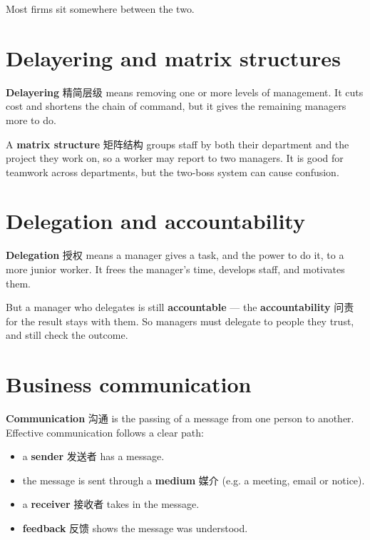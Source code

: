 \documentclass[11pt]{article}
\begin{document}
Most firms sit somewhere between the two.

\section*{Delayering and matrix structures}

\textbf{Delayering} 精简层级 means removing one or more levels of management. It cuts cost and shortens the chain of command, but it gives the remaining managers more to do.

A \textbf{matrix structure} 矩阵结构 groups staff by both their department and the project they work on, so a worker may report to two managers. It is good for teamwork across departments, but the two-boss system can cause confusion.

\section*{Delegation and accountability}

\textbf{Delegation} 授权 means a manager gives a task, and the power to do it, to a more junior worker. It frees the manager's time, develops staff, and motivates them.

But a manager who delegates is still \textbf{accountable} — the \textbf{accountability} 问责 for the result stays with them. So managers must delegate to people they trust, and still check the outcome.

\section*{Business communication}

\textbf{Communication} 沟通 is the passing of a message from one person to another. Effective communication follows a clear path:

\begin{itemize}
\item a \textbf{sender} 发送者 has a message.

\item the message is sent through a \textbf{medium} 媒介 (e.g. a meeting, email or notice).

\item a \textbf{receiver} 接收者 takes in the message.

\item \textbf{feedback} 反馈 shows the message was understood.

\end{itemize}
\end{document}

